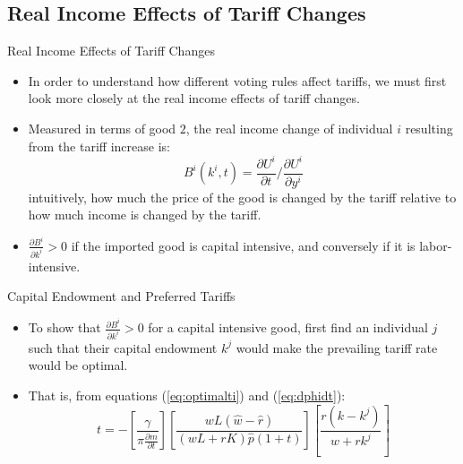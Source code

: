 \documentclass[aspectratio=169]{beamer}
\begin{document}
\subsection{Real Income Effects of Tariff Changes}


\begin{frame}{Real Income Effects of Tariff Changes}

\begin{itemize}
    \item<1-> In order to understand how different voting rules affect tariffs, we must first look more closely at the real income effects of tariff changes.
    \item<2-> Measured in terms of good $ 2 $, the real income change of individual $ i $ resulting from the tariff increase is:
    \begin{equation*}
        B^{i}\left( k^{i}, t \right) = \frac{\partial U^{i}}{\partial t} / \frac{\partial U^{i}}{\partial y^{i}}
    \end{equation*}
    intuitively, how much the price of the good is changed by the tariff relative to how much income is changed by the tariff.
    \item<3-> $ \frac{\partial B^{i}}{\partial k^{i}} > 0 $ if the imported good is capital intensive, and conversely if it is labor-intensive.
\end{itemize} 
    
\end{frame}


\begin{frame}{Capital Endowment and Preferred Tariffs}

\begin{itemize}
    \item<1-> To show that $ \frac{\partial B^{i}}{\partial k^{i}} > 0 $ for a capital intensive good, first find an individual $ j $ such that their capital endowment $ k^{j} $ would make the prevailing tariff rate would be optimal.
    \item<2-> That is, from equations (\ref{eq:optimalti}) and (\ref{eq:dphidt}):
    \begin{equation}
        t = -\left[ \frac{\gamma}{\pi\frac{\partial m}{\partial t}} \right] \left[ \frac{wL \left( \hat{w} - \hat{r} \right)}{\left( wL + rK \right) \hat{p} \left( 1 + t \right)}  \right] \left[ \frac{r \left( k - k^{j} \right)}{w + rk^{j}} \right]
        \label{eq:tforkj}
    \end{equation}
\end{itemize}
    
\end{frame}
\end{document}
